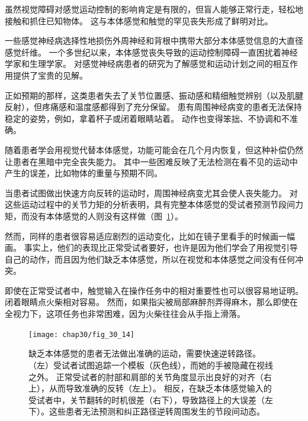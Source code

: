 \begin{proposition}[本体感觉和触觉对感觉运动控制至关重要] \label{box:30_3}
	
	\quad \quad 虽然视觉障碍对感觉运动控制的影响肯定是有限的，但盲人能够正常行走，轻松地接触和抓住已知物体。
	这与本体感觉和触觉的罕见丧失形成了鲜明对比。
	
	\quad \quad 一些感觉神经病选择性地损伤外周神经和背根中携带大部分本体感觉信息的大直径感觉纤维。
	一个多世纪以来，本体感觉丧失导致的运动控制障碍一直困扰着神经学家和生理学家。
	对感觉神经病患者的研究为了解感觉和运动计划之间的相互作用提供了宝贵的见解。
	
	\quad \quad 正如预期的那样，这类患者失去了关节位置感、振动感和精细触觉辨别（以及肌腱反射），但疼痛感和温度感都得到了充分保留。
	患有周围神经病变的患者无法保持稳定的姿势，例如，拿着杯子或闭着眼睛站着。
	动作也变得笨拙、不协调和不准确。
	
	\quad \quad 随着患者学会用视觉代替本体感觉，功能可能会在几个月内恢复，但这种补偿仍然让患者在黑暗中完全丧失能力。
	其中一些困难反映了无法检测在看不见的运动中产生的误差，比如物体的重量与预期不同。
	
	\quad \quad 当患者试图做出快速方向反转的运动时，周围神经病变尤其会使人丧失能力。
	对这些运动过程中的关节力矩的分析表明，具有完整本体感觉的受试者预测节段间力矩，而没有本体感觉的人则没有这样做（图~\ref{fig:30_14}）。
	
	\quad \quad 然而，同样的患者很容易适应剧烈的运动变化，比如在镜子里看手的时候画一幅画。
	事实上，他们的表现比正常受试者要好，也许是因为他们学会了用视觉引导自己的动作，而且因为他们缺乏本体感觉，所以在视觉和本体感觉之间没有任何冲突。
	
	\quad \quad 即使在正常受试者中，触觉输入在操作任务中的相对重要性也可以很容易地证明。
	闭着眼睛点火柴相对容易。
	然而，如果指尖被局部麻醉剂弄得麻木，那么即使在全视力下，这项任务也非常困难，因为火柴往往会从手指上滑落。
	
\end{proposition}


\begin{figure}[htbp]
	\centering
	\texttt{[image: chap30/fig\_30\_14]}
	\caption{缺乏本体感觉的患者无法做出准确的运动，需要快速逆转路径。
		（左）受试者试图追踪一个模板（灰色线），而她的手被隐藏在视线之外。
		正常受试者的肘部和肩部的关节角度显示出良好的对齐（右上），从而导致准确的反转（左上）。
		相反，在缺乏本体感觉输入的受试者中，关节翻转的时机很差（右下），导致路径上的大误差（左下）。这些患者无法预测和纠正路径逆转周围发生的节段间动态。}
	\label{fig:30_14}
\end{figure}


